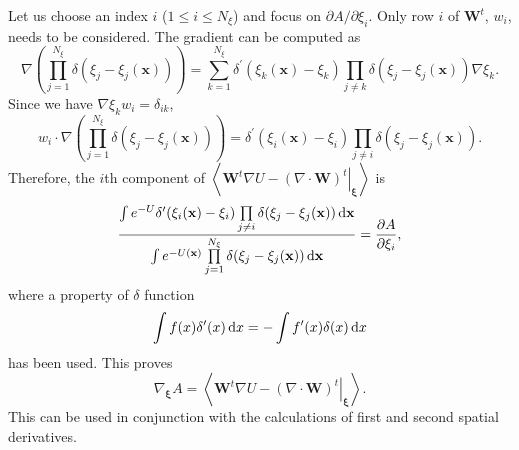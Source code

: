 Let us choose an index $i$ ($1\leq i\leq N_\xi$) and focus on $\partial A/\partial \xi_i$. Only row $i$ of $\mathbf{W}^t$, $w_i$, needs to be considered. The gradient can be computed as
\begin{equation}
    \nabla\left(\prod_{j=1}^{N_\xi}\delta(\xi_j-\xi_j(\mathbf{x}))\right)=\sum_{k=1}^{N_\xi}\delta^\prime(\xi_k(\mathbf{x})-\xi_k)\prod_{j\neq k}\delta(\xi_j-\xi_j(\mathbf{x}))\nabla \xi_k.
\end{equation}
Since we have $\nabla \xi_k w_i=\delta_{ik}$,
\begin{equation}
    w_i\cdot \nabla\left(\prod_{j=1}^{N_\xi}\delta(\xi_j-\xi_j(\mathbf{x}))\right)=\delta^\prime(\xi_i(\mathbf{x})-\xi_i)\prod_{j\neq i}\delta(\xi_j-\xi_j(\mathbf{x})).
\end{equation}
Therefore, the $i$th component of $\left<\left.\mathbf{W}^t\nabla U-(\nabla\cdot\mathbf{W})^t\right|_{\boldsymbol{\xi}}\right>$ is
\begin{equation}
    \frac{\int e^{-U}\delta^\prime(\xi_i(\mathbf{x})-\xi_i)\prod\limits_{j\neq i}\delta(\xi_j-\xi_j(\mathbf{x}))\mathop{}\!\mathrm{d} \mathbf{x}}{\int e^{-U(\mathbf{x})}\prod\limits_{j=1}^{N_\xi}\delta(\xi_j-\xi_j(\mathbf{x}))\mathop{}\!\mathrm{d} \mathbf{x}}=\frac{\partial A}{\partial \xi_i},
\end{equation}
where a property of $\delta$ function
\begin{equation}
   \int f(x)\delta^\prime(x)\mathop{}\!\mathrm{d} x=-\int f^\prime(x)\delta(x)\mathop{}\!\mathrm{d} x
\end{equation}
has been used. This proves
\begin{equation}
    \nabla_{\boldsymbol{\xi}}A=\left<\left.\mathbf{W}^t\nabla U-(\nabla\cdot\mathbf{W})^t\right|_{\boldsymbol{\xi}}\right>.
    \label{eq:FEM:ABF:ABFold}
\end{equation}
This can be used in conjunction with the calculations of first and second spatial derivatives. 

